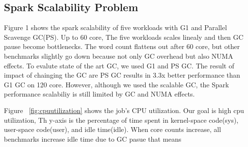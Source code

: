 \fi


\subsection{Spark Scalability Problem}
\ifkor
Figure 1 shows the spark scalability of five workloads with G1 and Parallel
Scavenge GC(PS).
Up to 60 core, The five workloads scales linealy and then GC pause become
bottlenecks.
The word count flattens out after 60 core, but other benchmarks slightly go
down because not only GC overhead but also NUMA effects. 
To evalute state of the art GC, we used G1 and PS GC.
The result of impact of chainging the GC are PS GC results in 3.3x better
performance than G1 GC on 120 core.
However, although we used the scalable GC, the Spark performance scalabiliy is
still limited by GC and NUMA effects.
\else

\fi



\ifkor
Figure ~\ref{fig:cpuutilization} shows the job's CPU utilization.
Our goal is high cpu utilization, 
Th y-axis is the percentage of time spent in kernel-space code(sys), user-space
code(user), and idle time(idle).
When core counts increase, all benchmarks increase idle time due to GC pasue
that means 

\else

\fi


\ifkor
\else

